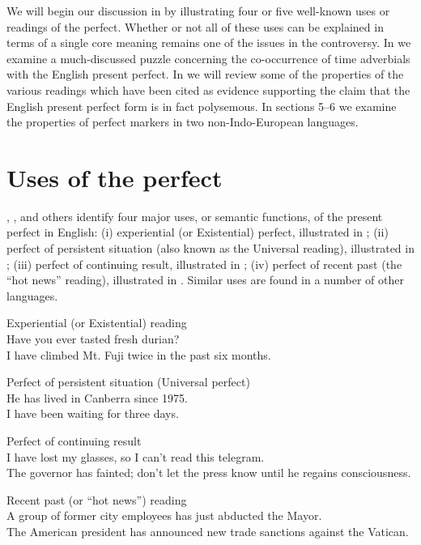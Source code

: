 We will begin our discussion in  by illustrating four or five well-known uses or readings of the perfect. Whether or not all of these uses can be explained in terms of a single core meaning remains one of the issues in the controversy. In  we examine a much-discussed puzzle concerning the co-occurrence of time adverbials with the English present perfect. In  we will review some of the properties of the various readings which have been cited as evidence supporting the claim that the English present perfect form is in fact polysemous. In sections 5–6 we examine the properties of perfect markers in two non-Indo-European languages.


\section{Uses of the perfect}\label{sec:22.2}

\citet{McCawley1971}, \citet{Comrie1976}, and others identify four major uses, or semantic functions, of the present perfect in English: (i) experiential (or Existential) perfect, illustrated in ; (ii) perfect of persistent situation (also known as the Universal reading), illustrated in ; (iii) perfect of continuing result, illustrated in ; (iv) perfect of recent past (the “hot news” reading), illustrated in . Similar uses are found in a number of other languages.


\ea
Experiential (or Existential) reading\\
\ea Have you ever tasted fresh durian?\\
\ex I have climbed Mt. Fuji twice in the past six months.
                       \z
\z

\ea
Perfect of persistent situation (Universal perfect)\\
\ea He has lived in Canberra since 1975.\\
\ex I have been waiting for three days.
                       \z
\z

\ea
Perfect of continuing result\\
\ea I have lost my glasses, so I can’t read this telegram.\\
\ex The governor has fainted; don’t let the press know until he regains consciousness.
                       \z
\z

\ea
Recent past (or “hot news”) reading\\
\ea A group of former city employees has just abducted the Mayor.\\
\ex The American president has announced new trade sanctions against the Vatican.
                       \z
\z



